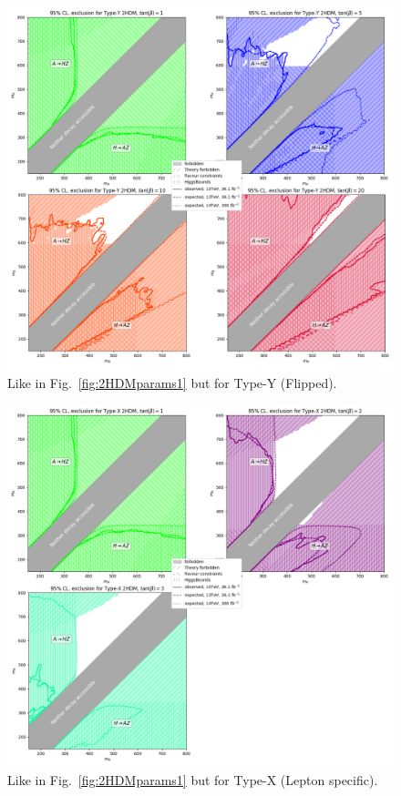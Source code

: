 \begin{figure}[t!]	     
    \includegraphics[width=\textwidth]{single_tbs/type3.png}
    \caption{Like in Fig.~\ref{fig:2HDMparams1} but for Type-Y (Flipped).}\label{fig:2HDMparams3}
\end{figure}

\begin{figure}[t!]
	\centering
    \includegraphics[width=\textwidth]{single_tbs/type4.png}
    \caption{Like in Fig.~\ref{fig:2HDMparams1} but for  Type-X (Lepton specific).}\label{fig:2HDMparams4}
\end{figure}

